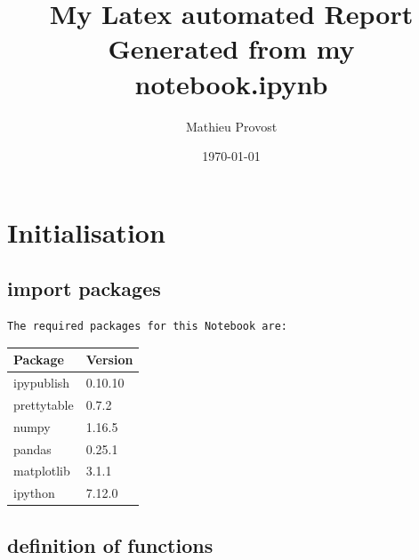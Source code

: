 \documentclass[reprint, floatfix, groupaddress, prb]{article}
\title{\huge{\textbf{My Latex automated Report}}\\[2ex]  \LARGE{Generated from my notebook.ipynb}}
\author{Mathieu Provost}
\date{\today}
\begin{document}
    
    
    
\maketitle

\newpage

\tableofcontents

\newpage

\listoffigures

\newpage

\listoftables

\newpage

    
    

    
    \hypertarget{initialisation}{%
\section{Initialisation}\label{initialisation}}

    \hypertarget{import-packages}{%
\subsection{import packages}\label{import-packages}}

    \begin{Verbatim}[commandchars=\\\{\}]
The required packages for this Notebook are:

    \end{Verbatim}

    
        
    \begin{table}[ht] 
\begin{tabular}[l]{ll}
\toprule
Package & Version\\ 
\midrule
ipypublish & 0.10.10\\ 
prettytable & 0.7.2\\ 
numpy & 1.16.5\\ 
pandas & 0.25.1\\ 
matplotlib & 3.1.1\\ 
ipython & 7.12.0\\ 
\bottomrule 
 \end{tabular}
\end{table}

    
    

    \hypertarget{definition-of-functions}{%
\subsection{definition of functions}\label{definition-of-functions}}
\end{document}
